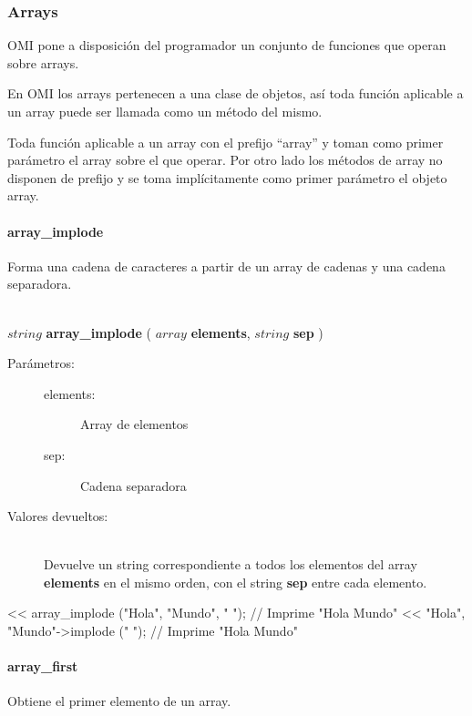 \subsubsection{Arrays}
OMI pone a disposición del programador un conjunto de funciones que operan sobre arrays.

En OMI los arrays pertenecen a una clase de objetos, así toda función aplicable a un array
puede ser llamada como un método del mismo. 

Toda función aplicable a un array con el prefijo ``array'' y toman como primer parámetro el array sobre el que 
operar. Por otro lado los métodos de array no disponen de prefijo y se toma implícitamente como primer parámetro el objeto 
array.

\paragraph{array\_implode}
Forma una cadena de caracteres a partir de un array de cadenas y una cadena separadora. 

\begin{framed}
\hfill \\ $string$ \textbf{array\_implode} ( $array$ \textbf{elements}, $string$ \textbf{sep} )  
\begin{description}
\item [Parámetros:] \hfill 
   \begin{description}
   \item[elements:] Array de elementos
   \item[sep:] Cadena separadora
   \end{description}
\item[Valores devueltos:] \hfill \\
   Devuelve un string correspondiente a todos los elementos del array \textbf{elements} en el mismo orden, con el string \textbf{sep} entre cada elemento. 
\end{description}
\end{framed}
     
\begin{myverbatim}   
   << array_implode ({"Hola", "Mundo"}, " "); // Imprime "Hola Mundo"
   << {"Hola", "Mundo"}->implode (" "); // Imprime "Hola Mundo"
\end{myverbatim}

\paragraph{array\_first}
Obtiene el primer elemento de un array. 

